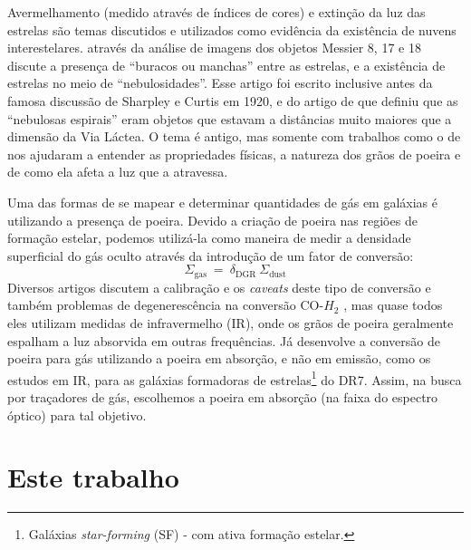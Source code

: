 Avermelhamento (medido através de índices de cores) e extinção da luz das estrelas são temas
discutidos e utilizados como evidência da existência de nuvens interestelares. \citep{Barnard.1908a}
através da análise de imagens dos objetos Messier 8, 17 e 18 discute a presença de ``buracos ou
manchas'' entre as estrelas, e a existência de estrelas no meio de ``nebulosidades''. Esse artigo
foi escrito inclusive antes da famosa discussão de Sharpley e Curtis em 1920, e do artigo de
\citep{Hubble.1925a} que definiu que as ``nebulosas espirais'' eram objetos que estavam a distâncias
muito maiores que a dimensão da Via Láctea. O tema é antigo, mas somente com trabalhos como o de
\citep{Draine.2003a} nos ajudaram a entender as propriedades físicas, a natureza dos grãos de
poeira e de como ela afeta a luz que a atravessa.

Uma das formas de se mapear e determinar quantidades de gás em galáxias é utilizando a presença de
poeira. Devido a criação de poeira nas regiões de formação estelar, podemos utilizá-la como maneira
de medir a densidade superficial do gás oculto através da introdução de um fator de conversão:
\begin{equation}
	\label{eq:dust2gas}
	\Sigma_{\mathrm{gas}}\ =\ \delta_{\mathrm{DGR}}\ \Sigma_{\mathrm{dust}}
\end{equation}
\noindent Diversos artigos discutem a calibração e os {\em caveats} deste tipo de conversão e também
problemas de degenerescência na conversão CO-$H_2$ \citep{Guiderdoni.Rocca.1987, Leroy.etal.2011a,
Leroy.etal.2013a, RemyRuyer.etal.2014a}, mas quase todos eles utilizam medidas de infravermelho
(IR), onde os grãos de poeira geralmente espalham a luz absorvida em outras frequências.
Já \citet{Brinchmann.etal.2013a} desenvolve a conversão de poeira para gás utilizando a poeira em
absorção, e não em emissão, como os estudos em IR, para as galáxias formadoras de
estrelas\footnote{Galáxias {\em star-forming} (SF) - com ativa formação estelar.} do \SDSS DR7.
Assim, na busca por traçadores de gás, escolhemos a poeira em absorção (na faixa do espectro óptico)
para tal objetivo.

\section{Este trabalho}
\label{sec:intro:estetrabalho}

